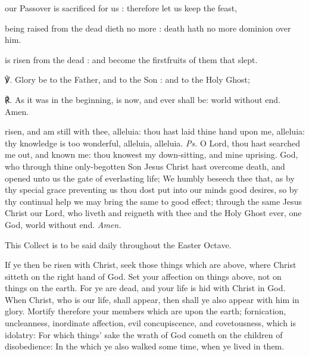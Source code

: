  our Passover is sacrificed for us : therefore let us keep the feast,
    


 being raised from the dead dieth no more : death hath no more dominion over him.
    

\clearpage
{} is risen from the dead : and become the firstfruits of them that slept.

\par
℣. Glory be to the Father, and to the Son : and to the Holy Ghost;\par
℟. As it was in the beginning, is now, and ever shall be: world without end. Amen.

\introit
{} risen, and am still with thee, alleluia: thou hast laid thine hand upon me, alleluia: thy knowledge is too wonderful, alleluia, alleluia. \textit{Ps.} O Lord, thou hast searched me out, and known me: thou knowest my down-sitting, and mine uprising.
\collect\label{EasterCollect}
 God, who through thine only-begotten Son Jesus Christ hast overcome death, and opened unto us the gate of everlasting life; We humbly beseech thee that, as by thy special grace preventing us thou dost put into our minds good desires, so by thy continual help we may bring the same to good effect; through the same Jesus Christ our Lord, who liveth and reigneth with thee and the Holy Ghost ever, one God, world without end. \textit{Amen.}
\begin{rubric}
    This Collect is to be said daily throughout the Easter Octave.
\end{rubric}
 If ye then be risen with Christ, seek those things which are above, where Christ sitteth on the right hand of God. Set your affection on things above, not on things on the earth. For ye are dead, and your life is hid with Christ in God. When Christ, who is our life, shall appear, then shall ye also appear with him in glory. Mortify therefore your members which are upon the earth; fornication, uncleanness, inordinate affection, evil concupiscence, and covetousness, which is idolatry: For which things' sake the wrath of God cometh on the children of disobedience: In the which ye also walked some time, when ye lived in them.

